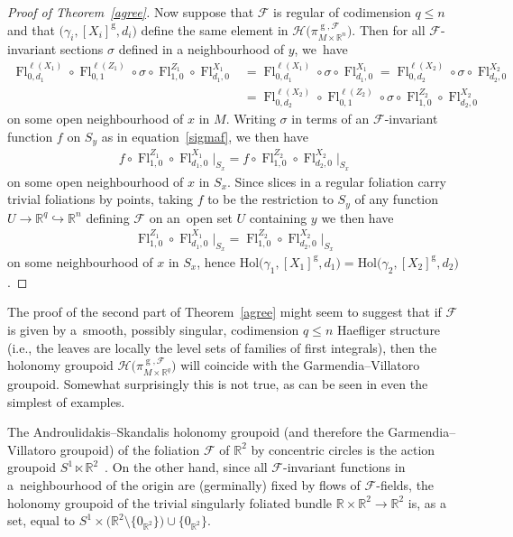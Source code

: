 \documentclass[10pt,a4paper]{amsart}
\numberwithin{equation}{section}
\def\g{\operatorname{g}}
\def\Fl{\operatorname{Fl}}
\def\FF{{\mathcal{F}}}
\def\HH{{\mathcal{H}}}
\def\RB{{\mathbb{R}}}
\begin{document}
\begin{proof}[Proof of Theorem~\ref{agree}]
Now suppose that $\FF$ is regular of codimension $q\leq n$ and that $\big(\gamma_{i},[X_{i}]^{\g},d_{i}\big)$ define the same element in $\HH\big(\pi_{M\times\RB^{n}}^{\g,\FF}\big)$. Then for all $\FF$-invariant sections $\sigma$ defined in a neighbourhood of $y$, we~have
\begin{align*}
\Fl^{\ell(X_{1})}_{0,d_{1}}\circ\Fl^{\ell(Z_{1})}_{0,1}\circ\sigma\circ\Fl^{Z_{1}}_{1,0} \circ\Fl^{X_{1}}_{d_{1},0} &= \Fl^{\ell(X_{1})}_{0,d_{1}}\circ\sigma\circ\Fl^{X_{1}}_{d_{1},0} = \Fl^{\ell(X_{2})}_{0,d_{2}}\circ\sigma\circ\Fl^{X_{2}}_{d_{2},0}
\\
&= \Fl^{\ell(X_{2})}_{0,d_{2}}\circ\Fl^{\ell(Z_{2})}_{0,1}\circ\sigma\circ \Fl^{Z_{2}}_{1,0}\circ\Fl^{X_{2}}_{d_{2},0}
\end{align*}
on some open neighbourhood of $x$ in $M$. Writing $\sigma$ in terms of an $\FF$-invariant function $f$ on $S_{y}$ as in equation~\eqref{sigmaf}, we then have
\begin{gather*}
f\circ\Fl^{Z_{1}}_{1,0}\circ\Fl^{X_{1}}_{d_{1},0}\big|_{S_{x}} = f\circ \Fl^{Z_{2}}_{1,0}\circ\Fl^{X_{2}}_{d_{2},0}\big|_{S_{x}}
\end{gather*}
on some open neighbourhood of $x$ in $S_{x}$. Since slices in a regular foliation carry trivial foliations by points, taking $f$ to be the restriction to $S_{y}$ of any function $U\rightarrow\RB^{q}\hookrightarrow\RB^{n}$ defining $\FF$ on an~open set $U$ containing $y$ we then have
\begin{gather*}
\Fl^{Z_{1}}_{1,0}\circ\Fl^{X_{1}}_{d_{1},0}\big|_{S_{x}} = \Fl^{Z_{2}}_{1,0}\circ\Fl^{X_{2}}_{d_{2},0}\big|_{S_{x}}
\end{gather*}
on some neighbourhood of $x$ in $S_{x}$, hence $\text{Hol}\big(\gamma_{1},[X_{1}]^{\g},d_{1}\big) = \text{Hol}\big(\gamma_{2},[X_{2}]^{\g},d_{2}\big)$.
\end{proof}

The proof of the second part of Theorem~\ref{agree} might seem to suggest that if $\FF$ is given by a~smooth, possibly singular, codimension $q\leq n$ Haefliger structure~\cite{ha3} (i.e., the leaves are locally the level sets of families of first integrals), then the holonomy groupoid $\HH\big(\pi_{M\times\RB^{q}}^{\g,\FF}\big)$ will coincide with the Garmendia--Villatoro groupoid. Somewhat surprisingly this is not true, as can be seen in even the simplest of examples.

\begin{Example}\label{counter1}
The Androulidakis--Skandalis holonomy groupoid (and therefore the Garmen\-dia--Villatoro groupoid) of the foliation $\FF$ of $\RB^{2}$ by concentric circles is the action groupoid $S^{1}\ltimes\RB^{2}$~\cite[Example 2, p.~496]{debord}. On the other hand, since all $\FF$-invariant functions in a~neigh\-bour\-hood of the origin are (germinally) fixed by flows of $\FF$-fields, the holonomy groupoid of the trivial singularly foliated bundle $\RB\times\RB^{2}\rightarrow\RB^{2}$ is, as a set, equal to $S^{1}\times\big(\RB^{2}\setminus\{0_{\RB^{2}}\}\big)\cup\{0_{\RB^{2}}\}$.
\end{Example}
\end{document}
